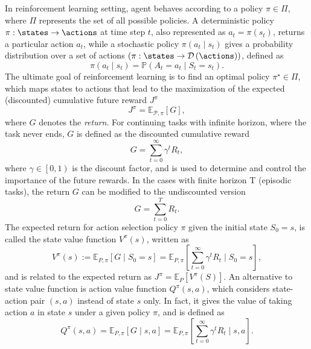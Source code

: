 In reinforcement learning setting, agent behaves according to a policy $\pi\in\Pi$, where $\Pi$ represents the set of all possible policies. A deterministic policy $\pi:\states\rightarrow\actions$ at time step $t$, also represented as $a_t=\pi\left(s_t\right)$, returns a particular action $a_t$, while a stochastic policy $\pi\left(a_t\mid s_t\right)$ gives a probability distribution over a set of actions $\left(\pi:\states\rightarrow\mathcal{D}\left(\actions\right)\right)$, defined as
 \begin{equation}
     \pi\left(a_t\mid s_t\right)=\mathbb{P}\left(A_t=a_t\mid S_t=s_t\right).\label{eq:stochasticPolicy}
 \end{equation}
The ultimate goal of reinforcement learning is to find an optimal policy $\pi^\star\in\Pi$, which maps states to actions that lead to the maximization of the expected (discounted) cumulative future reward $J^\pi$
\begin{equation}
    J^\pi=\mathbb{E}_{\mathcal{P},\pi}\left[G\right],\label{eq:expectedReturn}
\end{equation}
where $G$ denotes the \emph{return}. For continuing tasks with infinite horizon, where the task never ends, $G$ is defined as the discounted cumulative reward
\begin{equation}
    G=\sum_{t=0}^\infty\gamma^tR_t,
\end{equation}
where $\gamma\in\left[0,1\right)$ is the discount factor, and is used to determine and control the importance of the future rewards. In the cases with finite horizon T (episodic tasks), the return $G$ can be modified to the undiscounted version
\begin{equation}
    G=\sum_{t=0}^TR_t.
\end{equation}
The expected return for action selection policy $\pi$ given the initial state $S_0=s$, is called the state value function $V^\pi(s)$, written as
\begin{equation}
    V^\pi\left(s\right):=\mathbb{E}_{P,\pi}\left[G\mid S_0=s\right]=\mathbb{E}_{P,\pi}\left[\sum_{t=0}^\infty\gamma^tR_t\mid S_0=s\right],\label{eq:stateValueFunction}
\end{equation}
and is related to the expected return as $J^\pi=\mathbb{E}_P\left[V^\pi\left(S\right)\right]$.
An alternative to state value function is action value function $Q^\pi\left(s,a\right)$, which considers state-action pair $\left(s,a\right)$ instead of state $s$ only. In fact, it gives the value of taking action $a$ in state $s$ under a given policy $\pi$, and is defined as
\begin{equation}
    Q^\pi\left(s,a\right)=\mathbb{E}_{P,\pi}\left[G\mid s,a\right]=\mathbb{E}_{P,\pi}\left[\sum_{t=0}^\infty\gamma^tR_t\mid s,a\right].
\end{equation}
